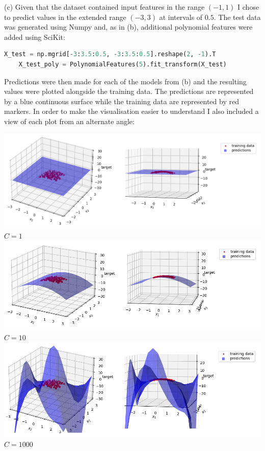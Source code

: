 \documentclass[12pt]{article}
\begin{document}
\noindent (c) Given that the dataset contained input features in the range $(-1, 1)$ I chose to predict values in the extended range $(-3, 3)$ at intervals of $0.5$. The test data was generated using Numpy and, as in (b), additional polynomial features were added using SciKit:

\begin{center}
    \lstset{basicstyle=\footnotesize}
    \begin{lstlisting}[language=Python]
    X_test = np.mgrid[-3:3.5:0.5, -3:3.5:0.5].reshape(2, -1).T
    X_test_poly = PolynomialFeatures(5).fit_transform(X_test)
    \end{lstlisting}
\end{center}

Predictions were then made for each of the models from (b) and the resulting values were plotted alongside the training data. The predictions are represented by a blue continuous surface while the training data are represented by red markers. In order to make the visualisation easier to understand I also included a view of each plot from an alternate angle:

\begin{center}
    \includegraphics[scale=0.65]{fig_3.png}
    $C = 1$
    \includegraphics[scale=0.65]{fig_4.png}
    $C = 10$
    \includegraphics[scale=0.65]{fig_5.png}
    $C = 1000$
\end{center}
\end{document}
